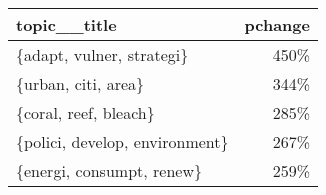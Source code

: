 \begin{tabular}{p{1.2cm}r}
\toprule
                   topic\_\_title &  pchange \\
\midrule
      \{adapt, vulner, strategi\} &     450\% \\
            \{urban, citi, area\} &     344\% \\
          \{coral, reef, bleach\} &     285\% \\
 \{polici, develop, environment\} &     267\% \\
      \{energi, consumpt, renew\} &     259\% \\
\bottomrule
\end{tabular}
